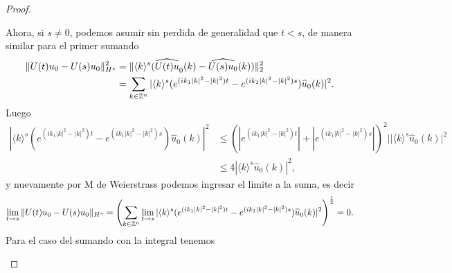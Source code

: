\begin{proof}
\begin{itemize}
       Ahora, si $s\neq 0$, podemos asumir sin perdida de generalidad que $t<s$, de manera similar para el primer sumando
       \begin{align*}
           \|U(t)u_0-U(s)u_0\|_{H^s}^2&=\|\langle k\rangle^s(\widehat{U(t)u}_0(k)-\widehat{U(s)u_0}(k))\|_2^2\\
           &=\sum_{k\in\mathbb{Z}^n}|\langle k\rangle^s(e^{(ik_1|k|^2-|k|^2)t}-e^{(ik_1|k|^2-|k|^2)s})\widehat{u}_0(k)|^2.
       \end{align*}
       Luego
       \begin{align*}
           |\langle k\rangle^s(e^{(ik_1|k|^2-|k|^2)t}-e^{(ik_1|k|^2-|k|^2)s})\hat{u}_0(k)|^2&\leq(|e^{(ik_1|k|^2-|k|^2)t}|+|e^{(ik_1|k|^2-|k|^2)s}|)^2||\langle k\rangle^s\hat{u}_0(k)|^2\\
           &\leq 4|\langle k\rangle^s\hat{u}_0(k)|^2,
       \end{align*}
       y nuevamente por M de Weierstrass podemos ingresar el limite a la suma, es decir
       $$\lim_{t\to s}\|U(t)u_0-U(s)u_0\|_{H^s}=\left(\sum_{k\in\mathbb{Z}^n}\lim_{t\to s}|\langle k\rangle^s(e^{(ik_1|k|^2-|k|^2)t}-e^{(ik_1|k|^2-|k|^2)s})\widehat{u}_0(k)|^2\right)^{\frac{1}{2}}=0.$$
       Para el caso del sumando con la integral tenemos


\end{itemize}
\end{proof}
